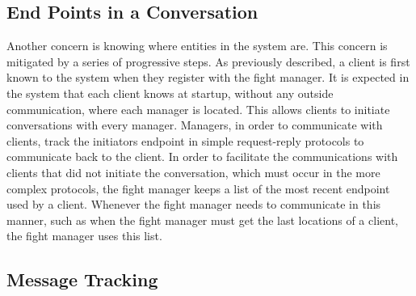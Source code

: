 \documentclass[12pt]{article}
\begin{document}
	\subsection{End Points in a Conversation}
		Another concern is knowing where entities in the system are. This concern is mitigated by a series of progressive steps. As previously described, a client is first known to the system when they register with the fight manager. It is expected in the system that each client knows at startup, without any outside communication, where each manager is located. This allows clients to initiate conversations with every manager. 
		Managers, in order to communicate with clients, track the initiators endpoint in simple request-reply protocols to communicate back to the client. In order to facilitate the communications with clients that did not initiate the conversation, which must occur in the more complex protocols, the fight manager keeps a list of the most recent endpoint used by a client. Whenever the fight manager needs to communicate in this manner, such as when the fight manager must get the last locations of a client, the fight manager uses this list.
	\subsection{Message Tracking}
		
\end{document}

